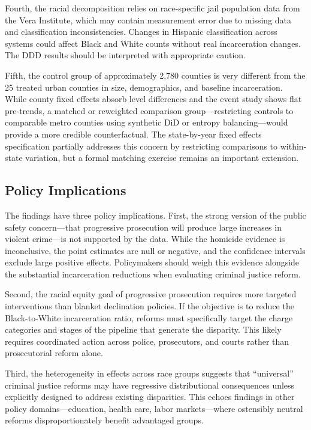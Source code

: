 \documentclass[12pt]{article}
\begin{document}
Fourth, the racial decomposition relies on race-specific jail population data from the Vera Institute, which may contain measurement error due to missing data and classification inconsistencies. Changes in Hispanic classification across systems could affect Black and White counts without real incarceration changes. The DDD results should be interpreted with appropriate caution.

Fifth, the control group of approximately 2,780 counties is very different from the 25 treated urban counties in size, demographics, and baseline incarceration. While county fixed effects absorb level differences and the event study shows flat pre-trends, a matched or reweighted comparison group---restricting controls to comparable metro counties using synthetic DiD \citep{arkhangelsky2021synthetic} or entropy balancing---would provide a more credible counterfactual. The state-by-year fixed effects specification partially addresses this concern by restricting comparisons to within-state variation, but a formal matching exercise remains an important extension.

\subsection{Policy Implications}

The findings have three policy implications. First, the strong version of the public safety concern---that progressive prosecution will produce large increases in violent crime---is not supported by the data. While the homicide evidence is inconclusive, the point estimates are null or negative, and the confidence intervals exclude large positive effects. Policymakers should weigh this evidence alongside the substantial incarceration reductions when evaluating criminal justice reform.

Second, the racial equity goal of progressive prosecution requires more targeted interventions than blanket declination policies. If the objective is to reduce the Black-to-White incarceration ratio, reforms must specifically target the charge categories and stages of the pipeline that generate the disparity. This likely requires coordinated action across police, prosecutors, and courts rather than prosecutorial reform alone.

Third, the heterogeneity in effects across race groups suggests that ``universal'' criminal justice reforms may have regressive distributional consequences unless explicitly designed to address existing disparities. This echoes findings in other policy domains---education, health care, labor markets---where ostensibly neutral reforms disproportionately benefit advantaged groups.
\end{document}
